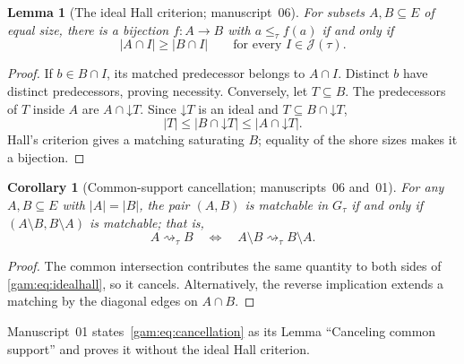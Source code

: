 \documentclass[11pt]{article}
\numberwithin{equation}{section}
\newtheorem{lemma}[theorem]{Lemma}
\newtheorem{corollary}[theorem]{Corollary}
\theoremstyle{definition}
\newcommand{\J}{\mathcal J(\tau)}
\newcommand{\down}{\mathord\downarrow}
\newcommand{\match}{\rightsquigarrow}
\begin{document}
\begin{lemma}[The ideal Hall criterion; manuscript~06]\label{gam:lem:idealhall}
For subsets $A,B\subseteq E$ of equal size, there is a bijection
$f:A\to B$ with $a\le_\tau f(a)$ if and only if
\begin{equation}
 |A\cap I|\ge |B\cap I|\qquad\text{for every }I\in\J.
 \label{gam:eq:idealhall}
\end{equation}
\end{lemma}
\begin{proof}
If $b\in B\cap I$, its matched predecessor belongs to $A\cap I$. Distinct
$b$ have distinct predecessors, proving necessity. Conversely, let
$T\subseteq B$. The predecessors of $T$ inside $A$ are $A\cap\down T$.
Since $\down T$ is an ideal and $T\subseteq B\cap\down T$,
\[
 |T|\le |B\cap\down T|\le |A\cap\down T|.
\]
Hall's criterion gives a matching saturating $B$; equality of the shore
sizes makes it a bijection.
\end{proof}

\begin{corollary}[Common-support cancellation; manuscripts~06 and~01]\label{gam:cor:cancel}
For any $A,B\subseteq E$ with $|A|=|B|$, the pair $(A,B)$ is matchable in
$G_\tau$ if and only if $(A\setminus B,B\setminus A)$ is matchable; that is,
\begin{equation}
 A\match_\tau B
 \quad\Longleftrightarrow\quad
 A\setminus B\match_\tau B\setminus A.
 \label{gam:eq:cancellation}
\end{equation}
\end{corollary}
\begin{proof}
The common intersection contributes the same quantity to both sides of
\eqref{gam:eq:idealhall}, so it cancels. Alternatively, the reverse implication
extends a matching by the diagonal edges on $A\cap B$.
\end{proof}

Manuscript~01 states~\eqref{gam:eq:cancellation} as its Lemma ``Canceling
common support'' and proves it without the ideal Hall criterion.
\end{document}
